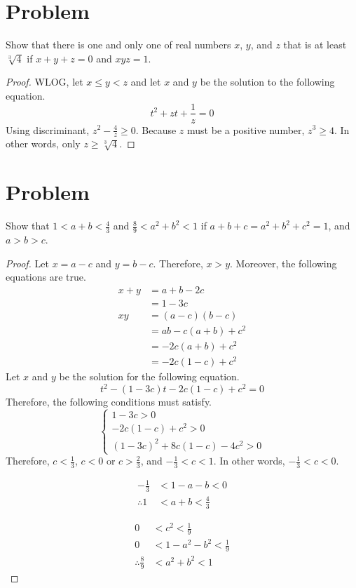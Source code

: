\documentclass{article}
\begin{document}
\section*{Problem}
Show that there is one and only one of real numbers $x$, $y$, and $z$ that is at least $\sqrt[3]{4}$ if $x + y + z = 0$ and $xyz = 1$.
\begin{proof}
WLOG, let $x \leq y < z$ and let $x$ and $y$ be the solution to the following equation.
\[
t^2 + zt + \frac{1}{z} = 0
\]
Using discriminant, $z^2 - \frac{4}{z} \geq 0$. Because $z$ must be a positive number, $z^3 \geq 4$. In other words, only $z \geq \sqrt[3]{4}$.
\end{proof}

\section*{Problem}
Show that $1 < a + b < \frac{4}{3}$ and $\frac{8}{9} < a^2 + b^2 < 1$ if $a + b + c = a^2 + b^2 + c^2 = 1$, and $a > b > c$.
\begin{proof}
Let $x = a - c$ and $y = b - c$. Therefore, $x > y$. Moreover, the following equations are true.
\begin{align*}
    x + y
    &= a + b - 2c \\
    &= 1 - 3c \\
    xy
    &= (a - c)(b - c) \\
    &= ab - c(a + b) + c^2 \\
    &= -2c(a + b) + c^2 \\
    &= -2c(1 - c) + c^2
\end{align*}
Let $x$ and $y$ be the solution for the following equation.
\[
t^2 - (1 - 3c)t - 2c(1 - c) + c^2 = 0
\]
Therefore, the following conditions must satisfy.
\[
\begin{cases}
    1 - 3c > 0 \\
    - 2c(1 - c) + c^2 > 0 \\
    (1 - 3c)^2 + 8c(1 - c) - 4c^2 > 0
\end{cases}
\]
Therefore, $c < \frac{1}{3}$, $c < 0$ or $c > \frac{2}{3}$, and $-\frac{1}{3} < c < 1$. In other words, $-\frac{1}{3} < c < 0$. \\
\begin{minipage}[t]{0.5\textwidth}
\begin{align*}
    -\frac{1}{3} &< 1 - a - b < 0 \\
    \therefore 1 &< a + b < \frac{4}{3}
\end{align*}
\end{minipage}
\begin{minipage}[t]{0.5\textwidth}
\begin{align*}
    0 &< c^2 < \frac{1}{9} \\
    0 &< 1 - a^2 - b^2 < \frac{1}{9} \\
    \therefore \frac{8}{9} &< a^2 + b^2 < 1
\end{align*}
\end{minipage}
\end{proof}
\end{document}
